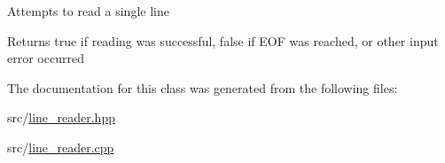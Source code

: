 Attempts to read a single line \begin{DoxyReturn}{Returns}
true if reading was successful, false if E\+OF was reached, or other input error occurred 
\end{DoxyReturn}


The documentation for this class was generated from the following files\+:\begin{DoxyCompactItemize}
\item 
src/\hyperlink{line__reader_8hpp}{line\+\_\+reader.\+hpp}\item 
src/\hyperlink{line__reader_8cpp}{line\+\_\+reader.\+cpp}\end{DoxyCompactItemize}
